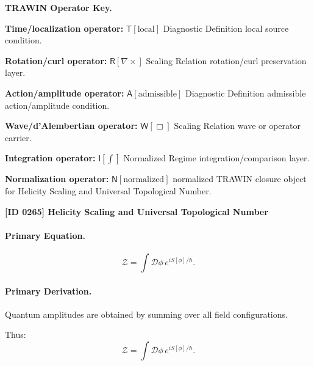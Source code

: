 \par\vspace{0.45\baselineskip}
\noindent\begin{minipage}[t]{\linewidth}
\begingroup
\small
\raggedright
\textbf{TRAWIN Operator Key.}\par
\noindent\textbf{Time/localization operator:} $\mathsf{T}\!\left[\mathrm{local}\right]$ Diagnostic Definition local source condition.\par
\noindent\textbf{Rotation/curl operator:} $\mathsf{R}\!\left[\nabla\times\right]$ Scaling Relation rotation/curl preservation layer.\par
\noindent\textbf{Action/amplitude operator:} $\mathsf{A}\!\left[\mathrm{admissible}\right]$ Diagnostic Definition admissible action/amplitude condition.\par
\noindent\textbf{Wave/d'Alembertian operator:} $\mathsf{W}\!\left[\Box\right]$ Scaling Relation wave or operator carrier.\par
\noindent\textbf{Integration operator:} $\mathsf{I}\!\left[\int\right]$ Normalized Regime integration/comparison layer.\par
\noindent\textbf{Normalization operator:} $\mathsf{N}\!\left[\mathrm{normalized}\right]$ normalized TRAWIN closure object for Helicity Scaling and Universal Topological Number.\par
\endgroup
\end{minipage}

\clearpage
\noindent\textbf{[ID 0265] Helicity Scaling and Universal Topological Number}\par
\vspace{0.35em}
\paragraph{Primary Equation.}
\begin{equation}
\mathcal{Z}
=
\int \mathcal{D}\phi \, e^{iS[\phi]/\hbar}.
\end{equation}

\paragraph{Primary Derivation.}
Quantum amplitudes are obtained by summing over all field configurations.

Thus:
\begin{equation}
\boxed{
\mathcal{Z}
=
\int \mathcal{D}\phi \, e^{iS[\phi]/\hbar}.
}
\end{equation}

